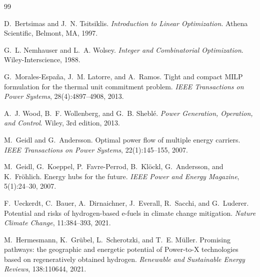 \documentclass[12pt,a4paper,oneside]{book}
\begin{document}














\appendix


%

%

%

\begin{thebibliography}{99}


D.~Bertsimas and J.~N. Tsitsiklis.
\emph{Introduction to Linear Optimization}.
Athena Scientific, Belmont, MA, 1997.

G.~L. Nemhauser and L.~A. Wolsey.
\emph{Integer and Combinatorial Optimization}.
Wiley-Interscience, 1988.

G.~Morales-Espa\~{n}a, J.~M. Latorre, and A.~Ramos.
Tight and compact MILP formulation for the thermal unit commitment problem.
\emph{IEEE Transactions on Power Systems}, 28(4):4897--4908, 2013.

A.~J. Wood, B.~F. Wollenberg, and G.~B. Shebl\'{e}.
\emph{Power Generation, Operation, and Control}.
Wiley, 3rd edition, 2013.


M.~Geidl and G.~Andersson.
Optimal power flow of multiple energy carriers.
\emph{IEEE Transactions on Power Systems}, 22(1):145--155, 2007.

M.~Geidl, G.~Koeppel, P.~Favre-Perrod, B.~Kl\"{o}ckl, G.~Andersson, and
K.~Fr\"{o}hlich.
Energy hubs for the future.
\emph{IEEE Power and Energy Magazine}, 5(1):24--30, 2007.

F.~Ueckerdt, C.~Bauer, A.~Dirnaichner, J.~Everall, R.~Sacchi, and G.~Luderer.
Potential and risks of hydrogen-based e-fuels in climate change mitigation.
\emph{Nature Climate Change}, 11:384--393, 2021.

M.~Hermesmann, K.~Gr\"{u}bel, L.~Scherotzki, and T.~E. M\"{u}ller.
Promising pathways: the geographic and energetic potential of Power-to-X
technologies based on regeneratively obtained hydrogen.
\emph{Renewable and Sustainable Energy Reviews}, 138:110644, 2021.


\end{thebibliography}
\end{document}
